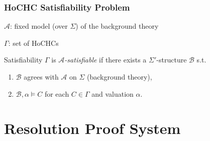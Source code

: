 \documentclass{beamer}
\begin{document}
\begin{frame}
  \frametitle{HoCHC Satisfiability Problem}
  ${\mathcal A}$: fixed model (over $\Sigma$) of the background theory

  $\Gamma$: set of HoCHCs

  \vspace{3mm}
  
  {\large\begin{block}{Satisfiability}
      $\Gamma$ is \emph{${\mathcal A}$-satisfiable} if there exists a $\Sigma'$-structure ${\mathcal B}$ s.t.
      \vspace{3pt}
      \begin{enumerate}
        \setlength\itemsep{5pt}
      \item ${\mathcal B}$ agrees with ${\mathcal A}$ on $\Sigma$ (background theory),
      \item \emph{${\mathcal B},\alpha\models C$} for each $C\in\Gamma$ and valuation $\alpha$.
      \end{enumerate}
    \end{block}
  }
\end{frame}


\section{Resolution Proof System}
\end{document}
